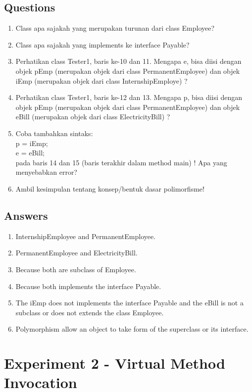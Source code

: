 \documentclass[12pt,titlepage]{article}
\begin{document}
\subsection{Questions}
\begin{enumerate}
    \item Class apa sajakah yang merupakan turunan dari class Employee?
    \item Class apa sajakah yang implements ke interface Payable?
    \item Perhatikan class Tester1, baris ke-10 dan 11. Mengapa e, bisa diisi dengan objek pEmp (merupakan objek dari class PermanentEmployee) dan objek iEmp (merupakan objek dari class InternshipEmploye) ?
    \item Perhatikan class Tester1, baris ke-12 dan 13. Mengapa p, bisa diisi dengan objek pEmp (merupakan objek dari class PermanentEmployee) dan objek eBill (merupakan objek dari class ElectricityBill) ?
    \item Coba tambahkan sintaks:\\
    p = iEmp;\\
    e = eBill;\\
    pada baris 14 dan 15 (baris terakhir dalam method main) ! Apa yang menyebabkan error?
    \item Ambil kesimpulan tentang konsep/bentuk dasar polimorfisme!
\end{enumerate}

\subsection{Answers}
\begin{enumerate}
    \item InternshipEmployee and PermanentEmployee.
    \item PermanentEmployee and ElectricityBill.
    \item Because both are subclass of Employee.
    \item Because both implements the interface Payable.
    \item The iEmp does not implements the interface Payable and the eBill is not a subclass or does not extends the class Employee.
    \item Polymorphism allow an object to take form of the superclass or its interface.
\end{enumerate}

\section{Experiment 2 - Virtual Method Invocation}
\end{document}
